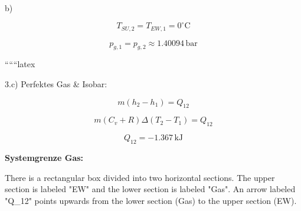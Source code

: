 b)

\[
T_{SU,2} = T_{EW,1} = 0^\circ \text{C}
\]

\[
p_{g,1} = p_{g,2} \approx 1.40094 \, \text{bar}
\]



``````latex


3.c) Perfektes Gas \& Isobar:

\[
m(h_2 - h_1) = Q_{12}
\]

\[
m(C_v + R) \Delta (T_2 - T_1) = Q_{12}
\]

\[
Q_{12} = -1.367 \, \text{kJ}
\]

\textbf{Systemgrenze Gas:}

There is a rectangular box divided into two horizontal sections. The upper section is labeled "EW" and the lower section is labeled "Gas". An arrow labeled "Q_{12}" points upwards from the lower section (Gas) to the upper section (EW).